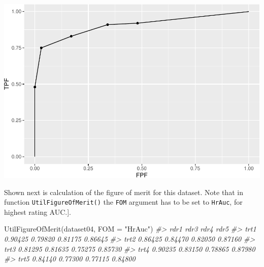 \documentclass[
]{book}
\newenvironment{Shaded}{\begin{snugshade}}{\end{snugshade}}
\newcommand{\AttributeTok}[1]{\textcolor[rgb]{0.77,0.63,0.00}{#1}}
\newcommand{\CommentTok}[1]{\textcolor[rgb]{0.56,0.35,0.01}{\textit{#1}}}
\newcommand{\DecValTok}[1]{\textcolor[rgb]{0.00,0.00,0.81}{#1}}
\newcommand{\FunctionTok}[1]{\textcolor[rgb]{0.00,0.00,0.00}{#1}}
\newcommand{\NormalTok}[1]{#1}
\newcommand{\OtherTok}[1]{\textcolor[rgb]{0.56,0.35,0.01}{#1}}
\newcommand{\SpecialCharTok}[1]{\textcolor[rgb]{0.00,0.00,0.00}{#1}}
\newcommand{\StringTok}[1]{\textcolor[rgb]{0.31,0.60,0.02}{#1}}
\begin{document}
\begin{Shaded}
\end{Shaded}

\includegraphics{03-empirical_files/figure-latex/unnamed-chunk-4-1.pdf}

Shown next is calculation of the figure of merit for this dataset. Note that in function \texttt{UtilFigureOfMerit()} the \texttt{FOM} argument has to be set to \texttt{HrAuc}, for highest rating AUC.{]}.

\begin{Shaded}
\begin{Highlighting}[]
\FunctionTok{UtilFigureOfMerit}\NormalTok{(dataset04, }\AttributeTok{FOM =} \StringTok{"HrAuc"}\NormalTok{)}
\CommentTok{\#\textgreater{}         rdr1    rdr3    rdr4    rdr5}
\CommentTok{\#\textgreater{} trt1 0.90425 0.79820 0.81175 0.86645}
\CommentTok{\#\textgreater{} trt2 0.86425 0.84470 0.82050 0.87160}
\CommentTok{\#\textgreater{} trt3 0.81295 0.81635 0.75275 0.85730}
\CommentTok{\#\textgreater{} trt4 0.90235 0.83150 0.78865 0.87980}
\CommentTok{\#\textgreater{} trt5 0.84140 0.77300 0.77115 0.84800}
\end{Highlighting}
\end{Shaded}
\end{document}

